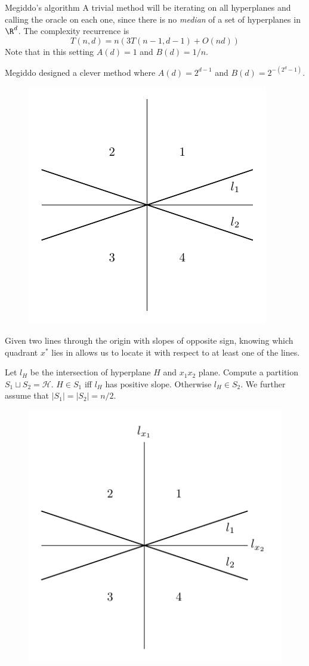 \documentclass{beamer}
\begin{document}
\begin{frame}[allowframebreaks]{Megiddo's algorithm}
    A trivial method will be iterating on all hyperplanes and calling the oracle on each one, since there is no \emph{median} of a set of hyperplanes in $\R^d$. The complexity recurrence is 
    \[T(n,d)=n(3T(n-1,d-1)+O(nd))\] 
    Note that in this setting $A(d)=1$ and $B(d)=1/n$.

    \newpage
    Megiddo designed a clever method where $A(d)=2^{d-1}$ and $B(d)=2^{-(2^d-1)}$.

    \begin{lemma}
        \begin{figure}
            \includegraphics[width=.3\textwidth]{images/1234.pdf}
        \end{figure}
        Given two lines through the origin with slopes of opposite sign, knowing which quadrant $x^*$ lies in allows us to locate it with respect to at least one of the lines.
    \end{lemma}
    \newpage
    Let $l_H$ be the intersection of hyperplane $H$ and $x_1x_2$ plane.
    Compute a partition $S_1\sqcup S_2=\mathcal H$. 
    $H\in S_1$ iff $l_H$ has positive slope. Otherwise $l_H\in S_2$. We further assume that $|S_1|=|S_2|=n/2$.
    \noindent
    \begin{minipage}[t]{.5\textwidth}
    \begin{figure}
        \includegraphics[width=.85\textwidth]{images/4l1234.pdf}

\end{figure}
\end{minipage}
\end{frame}
\end{document}
